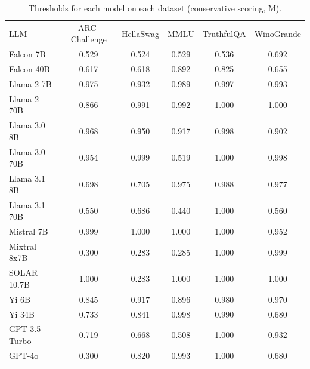 \begin{table}[h]
\caption{Thresholds for each model on each dataset (conservative scoring, M). }
\label{tab:thresholds_prob_max_k20_w2}
\centering
\begin{tabular}{l S[table-format=3.1] S[table-format=3.1] S[table-format=3.1] S[table-format=3.1] S[table-format=3.1]}
\toprule
LLM & ARC-Challenge & HellaSwag & MMLU & TruthfulQA & WinoGrande \\ 
\cmidrule(lr){1-1} \cmidrule(lr){2-2} \cmidrule(lr){3-3} \cmidrule(lr){4-4} \cmidrule(lr){5-5} \cmidrule(lr){6-6}
Falcon 7B & 0.529 & 0.524 & 0.529 & 0.536 & 0.692\\
Falcon 40B & 0.617 & 0.618 & 0.892 & 0.825 & 0.655\\
Llama 2 7B & 0.975 & 0.932 & 0.989 & 0.997 & 0.993\\
Llama 2 70B & 0.866 & 0.991 & 0.992 & 1.000 & 1.000\\
Llama 3.0 8B & 0.968 & 0.950 & 0.917 & 0.998 & 0.902\\
Llama 3.0 70B & 0.954 & 0.999 & 0.519 & 1.000 & 0.998\\
Llama 3.1 8B & 0.698 & 0.705 & 0.975 & 0.988 & 0.977\\
Llama 3.1 70B & 0.550 & 0.686 & 0.440 & 1.000 & 0.560\\
Mistral 7B & 0.999 & 1.000 & 1.000 & 1.000 & 0.952\\
Mixtral 8x7B & 0.300 & 0.283 & 0.285 & 1.000 & 0.999\\
SOLAR 10.7B & 1.000 & 0.283 & 1.000 & 1.000 & 1.000\\
Yi 6B & 0.845 & 0.917 & 0.896 & 0.980 & 0.970\\
Yi 34B & 0.733 & 0.841 & 0.998 & 0.990 & 0.680\\
GPT-3.5 Turbo & 0.719 & 0.668 & 0.508 & 1.000 & 0.932\\
GPT-4o & 0.300 & 0.820 & 0.993 & 1.000 & 0.680\\
\bottomrule
\end{tabular}
\end{table}
